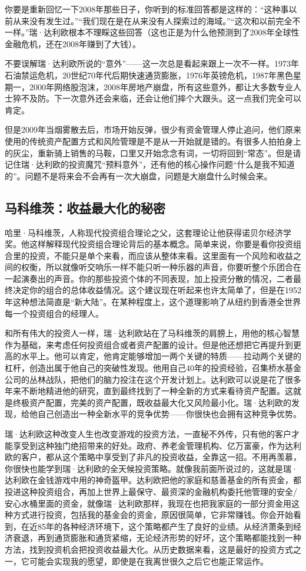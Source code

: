 你要是重新回忆一下2008年那些日子，你听到的标准回答都是这样的：“这种事以前从来没有发生过。”“我们现在是在从来没有人探索过的海域。”“这次和以前完全不一样。”瑞·达利欧根本不理睬这些回答（这也正是为什么他预测到了2008年全球性金融危机，还在2008年赚到了大钱）。

不要误解瑞·达利欧所说的“意外”——这一次总是看起来跟上一次不一样。1973年石油禁运危机，20世纪70年代后期快速通货膨胀，1976年英镑危机，1987年黑色星期一，2000年网络股泡沫，2008年房地产崩盘，所有这些意外，都让大多数专业人士猝不及防。下一次意外还会来临，还会让他们摔个大跟头。这一点我们完全可以肯定。

但是2009年当烟雾散去后，市场开始反弹，很少有资金管理人停止追问，他们原来使用的传统资产配置方式和风险管理是不是从一开始就是错的。有很多人拍拍身上的灰尘，重新骑上销售的马鞍，口里又开始念念有词，一切将回到“常态”。但是请记住瑞·达利欧的投资魔咒“预料意外”，还有他的核心操作问题“什么是我不知道的”。问题不是将来会不会再有一次大崩盘，问题是大崩盘什么时候会来。

\subsection{马科维茨：收益最大化的秘密}

哈里·马科维茨，人称现代投资组合理论之父，这套理论让他获得诺贝尔经济学奖。他这样解释现代投资组合理论背后的基本概念。简单来说，你要是看你投资组合里的投资，不能只是单个来看，而应该从整体来看。这里面有一个风险和收益之间的权衡，所以就像听交响乐一样不能只听一种乐器的声音，你要听整个乐团合在一起演奏出的声音。你的那些投资个体的不同表现，加上投资分散的情况，二者最终决定你的组合的总体收益情况。这个建议现在听起来也许太简单了，但是在1952年这种想法简直是“新大陆”。在某种程度上，这个道理影响了从纽约到香港全世界每一个投资组合的经理人。

和所有伟大的投资人一样，瑞·达利欧站在了马科维茨的肩膀上，用他的核心智慧作为基础，来考虑任何投资组合或者资产配置的设计。但是他还想把它再提升到更高的水平上。他可以肯定，他肯定能够增加一两个关键的特质——拉动两个关键的杠杆，创造出属于他自己的突破性发现。他用自己40年的投资经验，召集桥水基金公司的丛林战队，把他们的脑力投注在这个开发计划上。达利欧可以说是花了很多年来不断地精进他的研究，直到最终找到了一种全新的方式来看待资产配置。这就是终极资产配置，完美的资产配置，既收益最大化又风险最小化。瑞·达利欧的发现，给他自己创造出一种全新水平的竞争优势——你很快也会拥有这种竞争优势。

瑞·达利欧这种改变人生也改变游戏的投资方法，一直秘不外传，只有他的客户才能享受到这种独门绝招带来的好处。政府、养老金管理机构、亿万富豪，作为达利欧的客户，都从这个策略中享受到了非凡的投资收益，全靠这一招。不用再羡慕，你很快也能学到瑞·达利欧的全天候投资策略。就像我前面所说过的，这就是瑞·达利欧在金钱游戏中用的神奇盔甲。达利欧把他的家庭和慈善基金的所有资金，都投进这种投资组合，再加上世界上最保守、最资深的金融机构委托他管理的安全/安心水桶里面的资金，就像瑞·达利欧那样，我现在也把我家庭的一部分资金用这种方式进行投资，包括我的基金会的资金，原因很简单，它非常赚钱。你会开始看到，在近85年的各种经济环境下，这个策略都产生了良好的业绩。从经济萧条到经济衰退，再到通货膨胀和通货紧缩，无论经济形势的好坏，这个策略都能找到一种方法，找到投资机会把投资收益最大化。从历史数据来看，这是最好的投资方式之一，它可能会实现我的愿望，即使是在我离世很久之后它也能正常运作。

